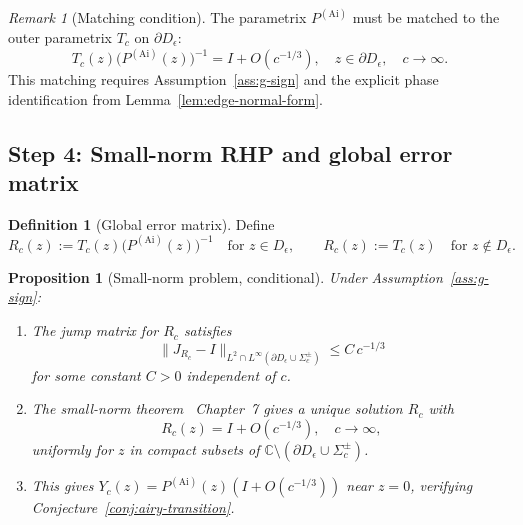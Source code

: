 \documentclass[12pt,a4paper]{amsart}
\newtheorem{proposition}[theorem]{Proposition}
\theoremstyle{definition}
\newtheorem{definition}[theorem]{Definition}
\theoremstyle{remark}
\newtheorem{remark}[theorem]{Remark}
\newcommand{\norm}[1]{\|#1\|}
\begin{document}
\begin{remark}[Matching condition]
\label{rem:matching}
The parametrix $P^{(\mathrm{Ai})}$ must be matched to the outer
parametrix $T_c$ on $\partial D_\epsilon$:
\begin{equation}\label{eq:matching}
  T_c(z)\bigl(P^{(\mathrm{Ai})}(z)\bigr)^{-1}
  =I+O(c^{-1/3}),\quad z\in\partial D_\epsilon,\quad c\to\infty.
\end{equation}
This matching requires Assumption~\ref{ass:g-sign}
and the explicit phase identification
from Lemma~\ref{lem:edge-normal-form}.
\end{remark}

\subsection{Step 4: Small-norm RHP and global error matrix}

\begin{definition}[Global error matrix]
\label{def:error-matrix}
Define
\begin{equation}\label{eq:error-matrix}
  R_c(z):=T_c(z)\bigl(P^{(\mathrm{Ai})}(z)\bigr)^{-1}
  \quad\text{for }z\in D_\epsilon,
  \qquad
  R_c(z):=T_c(z)
  \quad\text{for }z\notin D_\epsilon.
\end{equation}
\end{definition}

\begin{proposition}[Small-norm problem, conditional]
\label{prop:small-norm}
Under Assumption~\ref{ass:g-sign}:
\begin{enumerate}[label=(\roman*)]
\item The jump matrix for $R_c$ satisfies
  \begin{equation}\label{eq:Rc-jump-bound}
    \norm{J_{R_c}-I}_{L^2\cap L^\infty(\partial D_\epsilon\cup\Sigma_c^\pm)}
    \le C\,c^{-1/3}
  \end{equation}
  for some constant $C>0$ independent of $c$.
\item The small-norm theorem~\cite{Deift1999} Chapter~7 gives a unique
  solution $R_c$ with
  \begin{equation}\label{eq:Rc-norm}
    R_c(z)=I+O(c^{-1/3}),\quad c\to\infty,
  \end{equation}
  uniformly for $z$ in compact subsets of
  $\mathbb{C}\setminus(\partial D_\epsilon\cup\Sigma_c^\pm)$.
\item This gives $Y_c(z)=P^{(\mathrm{Ai})}(z)(I+O(c^{-1/3}))$
  near $z=0$, verifying Conjecture~\ref{conj:airy-transition}.
\end{enumerate}
\end{proposition}
\end{document}
